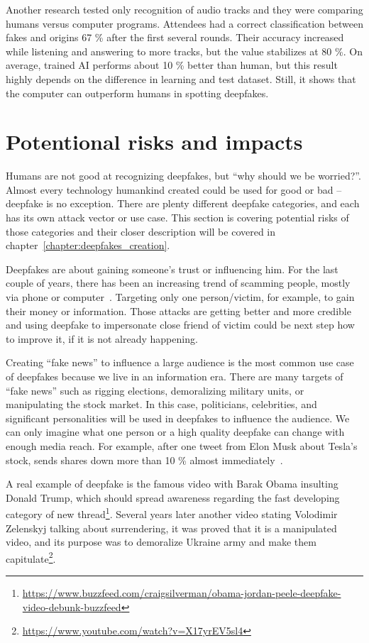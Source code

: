 Another research tested only recognition of audio tracks and they were comparing humans versus computer programs. Attendees had a correct classification between fakes and origins 67 \% after the first several rounds. Their accuracy increased while listening and answering to more tracks, but the value stabilizes at 80 \%. On average, trained AI performs about 10 \% better than human, but this result highly depends on the difference in learning and test dataset. Still, it shows that the computer can outperform humans in spotting deepfakes. \cite{HumanPerceptionAudio}

\section{Potentional risks and impacts}

Humans are not good at recognizing deepfakes, but “why should we be worried?”. Almost every technology humankind created could be used for good or bad – deepfake is no exception. There are plenty different deepfake categories, and each has its own attack vector or use case. This section is covering potential risks of those categories and their closer description will be covered in chapter~\ref{chapter:deepfakes_creation}.

Deepfakes are about gaining someone’s trust or influencing him. For the last couple of years, there has been an increasing trend of scamming people, mostly via phone or computer~\cite{HybridVishingAttacksSkyrocketing}. Targeting only one person/victim, for example, to gain their money or information. Those attacks are getting better and more credible and using deepfake to impersonate close friend of victim could be next step how to improve it, if it is not already happening.

Creating “fake news” to influence a large audience is the most common use case of deepfakes because we live in an information era. There are many targets of “fake news” such as rigging elections, demoralizing military units, or manipulating the stock market. In this case, politicians, celebrities, and significant personalities will be used in deepfakes to influence the audience. We can only imagine what one person or a high quality deepfake can change with enough media reach. For example, after one tweet from Elon Musk about Tesla’s stock, sends shares down more than 10 \% almost immediately~\cite{ElonMusksTweets}.~\cite{IncreasingThreatofDeepfakeIdentites}

A real example of deepfake is the famous video with Barak Obama insulting Donald Trump, which should spread awareness regarding the fast developing category of new thread\footnote{\url{https://www.buzzfeed.com/craigsilverman/obama-jordan-peele-deepfake-video-debunk-buzzfeed}}. Several years later another video stating Volodimir Zelenskyj talking about surrendering, it was proved that it is a manipulated video, and its purpose was to demoralize Ukraine army and make them capitulate\footnote{\url{https://www.youtube.com/watch?v=X17yrEV5sl4}}.

